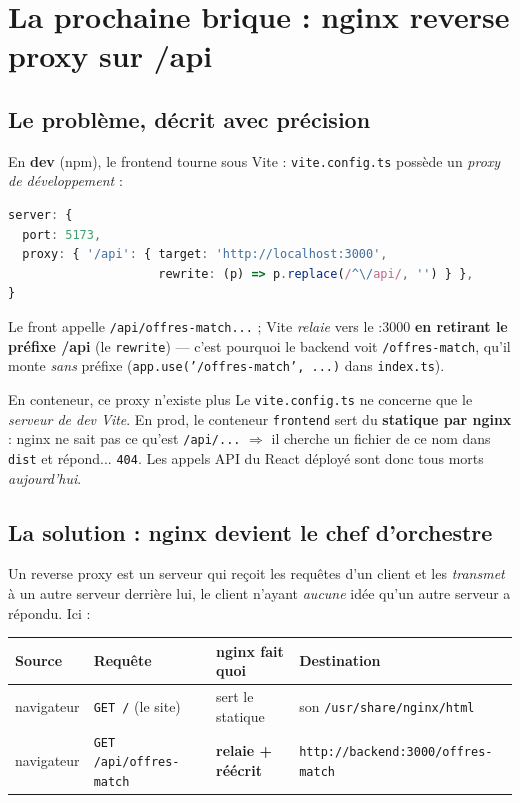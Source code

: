 \documentclass[11pt,a4paper]{article}
\begin{document}
\section{La prochaine brique : nginx reverse proxy sur /api}

\subsection{Le problème, décrit avec précision}

En \textbf{dev} (npm), le frontend tourne sous Vite : \texttt{vite.config.ts}
possède un \emph{proxy de développement} :

\begin{lstlisting}[language=TypeScript]
server: {
  port: 5173,
  proxy: { '/api': { target: 'http://localhost:3000',
                     rewrite: (p) => p.replace(/^\/api/, '') } },
}
\end{lstlisting}

Le front appelle \texttt{/api/offres-match...} ; Vite \emph{relaie} vers le
:3000 \textbf{en retirant le préfixe /api} (le \texttt{rewrite}) --- c'est
pourquoi le backend voit \texttt{/offres-match}, qu'il monte \emph{sans}
préfixe (\texttt{app.use('/offres-match', ...)} dans \texttt{index.ts}).

\begin{warnbox}{En conteneur, ce proxy n'existe plus}
Le \texttt{vite.config.ts} ne concerne que le \emph{serveur de dev Vite}.
En prod, le conteneur \texttt{frontend} sert du \textbf{statique par nginx} :
nginx ne sait pas ce qu'est \texttt{/api/...} $\Rightarrow$ il cherche un
fichier de ce nom dans \texttt{dist} et répond... \texttt{404}. Les appels
API du React déployé sont donc tous morts \emph{aujourd'hui}.
\end{warnbox}

\subsection{La solution : nginx devient le chef d'orchestre}

Un reverse proxy est un serveur qui reçoit les requêtes d'un client et les
\emph{transmet} à un autre serveur derrière lui, le client n'ayant
\emph{aucune} idée qu'un autre serveur a répondu. Ici :

\begin{center}
\begin{tabular}{@{}p{1.8cm}p{4.2cm}p{2.0cm}p{4.4cm}@{}}
\toprule
Source & Requête & nginx fait quoi & Destination \\
\midrule
navigateur & \texttt{GET /} (le site) & sert le statique &
son \texttt{/usr/share/nginx/html} \\
navigateur & \texttt{GET /api/offres-match} & \textbf{relaie + réécrit} &
\texttt{http://backend:3000/offres-match} \\
\bottomrule
\end{tabular}
\end{center}
\end{document}
